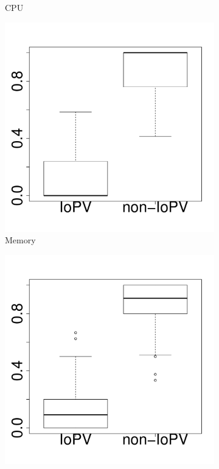 \begin{figure}[t]
\begin{subfigure}{0.19\textwidth}
                \caption{CPU}
        \end{subfigure}%
        \begin{subfigure}{0.19\textwidth}
                \includegraphics[width=\linewidth]{Figures/mem-hadoop-boxplot.pdf}
                \caption{Memory}
        \end{subfigure}%
        \begin{subfigure}{0.19\textwidth}
                \includegraphics[width=\linewidth]{Figures/ioread-hadoop-boxplot.pdf}

\end{subfigure}
\end{figure}
